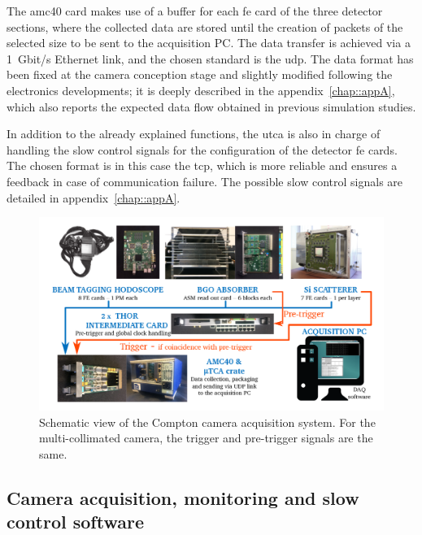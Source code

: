 The \gls{amc}40 card makes use of a buffer for each \gls{fe} card of the three detector sections, where the collected data are stored until the creation of packets of the selected size to be sent to the acquisition PC. The data transfer is achieved via a 1~Gbit/s Ethernet link, and the chosen standard is the \gls{udp}. The data format has been fixed at the camera conception stage and slightly modified following the electronics developments; it is deeply described in the appendix~\ref{chap::appA}, which also reports the expected data flow obtained in previous simulation studies.
  
In addition to the already explained functions, the \gls{utca} is also in charge of handling the slow control signals for the configuration of the detector \gls{fe} cards. The chosen format is in this case the \gls{tcp}, which is more reliable and ensures a feedback in case of communication failure. The possible slow control signals are detailed in appendix~\ref{chap::appA}.


\begin{figure}[!htbp]
\centering
\includegraphics[width=\textwidth]{03_GraphicFiles/chapter3_CLaRySproto/Electronics_Acquisition/daq_scheme.png}
\caption{Schematic view of the Compton camera acquisition system. For the multi-collimated camera, the trigger and pre-trigger signals are the same.}
\label{chap3::fig::DAQscheme}
\end{figure}


\subsection{Camera acquisition, monitoring and slow control software}\label{chap3::subsec::cameraSoftware}

